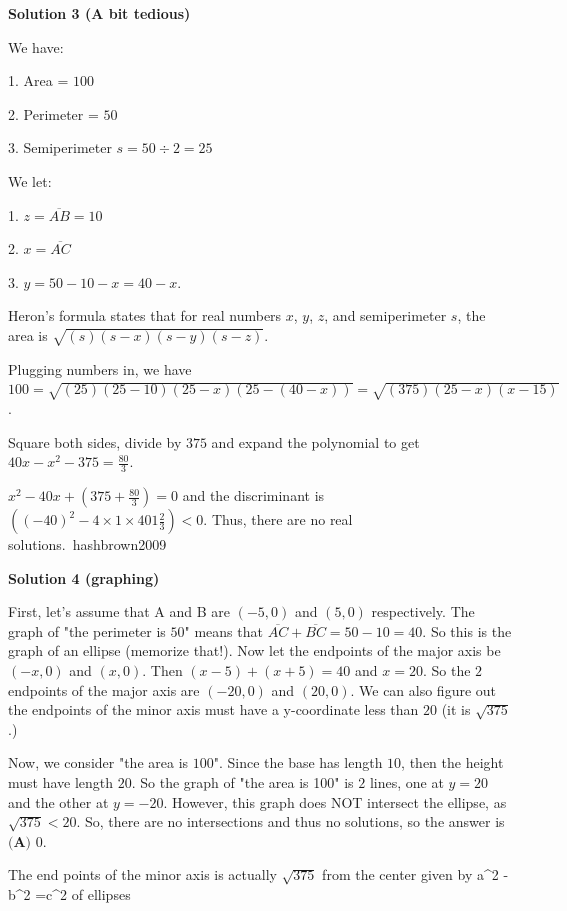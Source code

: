 \begin{enumerate}
 



\textbf{Solution 3 (A bit tedious)}

We have:

 1. Area = $100$

 2. Perimeter = $50$

 3. Semiperimeter $s = 50 \div 2 = 25$

 We let:

 1. $z = \overline{AB} = 10$

 2. $x = \overline{AC}$

 3. $y = 50-10-x = 40-x$.

 
Heron's formula states that for real numbers $x$, $y$, $z$, and semiperimeter $s$, the area is $\sqrt{(s)(s-x)(s-y)(s-z)}$.

 Plugging numbers in, we have $100 = \sqrt{(25)(25-10)(25-x)(25-(40-x))} = \sqrt{(375)(25-x)(x-15)}$.

 
Square both sides, divide by $375$ and expand the polynomial to get $40x - x^2 - 375 = \frac{80}{3}$.

 
$x^2 - 40x + \left(375 + \frac{80}{3}\right) = 0$ and the discriminant is $\left((-40)^2 - 4 \times 1 \times 401 \frac{2}{3}\right) < 0$. Thus, there are no real solutions.~hashbrown2009

 



\textbf{Solution 4 (graphing)}

First, let's assume that A and B are $(-5,0)$ and $(5,0)$ respectively. The graph of "the perimeter is $50$" means that $\overline{AC}+\overline{BC}=50-10=40$. So this is the graph of an ellipse (memorize that!). Now let the endpoints of the major axis be $(-x,0)$ and $(x,0)$. Then $(x-5)+(x+5)=40$ and $x=20$. So the $2$ endpoints of the major axis are $(-20,0)$ and $(20,0)$. We can also figure out the endpoints of the minor axis must have a y-coordinate less than $20$ (it is $\sqrt{375}$.)

 Now, we consider "the area is $100$". Since the base has length $10$, then the height must have length $20$. So the graph of "the area is 100" is $2$ lines, one at $y=20$ and the other at $y=-20$. However, this graph does NOT intersect the ellipse, as $\sqrt{375} < 20$. So, there are no intersections and thus no solutions, so the answer is $\boxed{\textbf{(A) }0}$.

 The end points of the minor axis is actually $\sqrt{375}$ from the center given by a\textasciicircum{}2 -b\textasciicircum{}2 =c\textasciicircum{}2 of ellipses


\end{enumerate}
